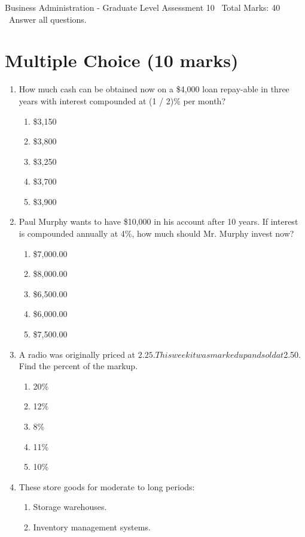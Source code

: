 \documentclass[12pt]{article}
\begin{document}
\begin{center}
Business Administration - Graduate Level Assessment 10 \
Total Marks: 40 \
Answer all questions.
\end{center}

\section*{Multiple Choice (10 marks)}
\begin{enumerate}[label=\arabic*.]
\item How much cash can be obtained now on a \$4,000 loan repay-able in three years with interest compounded at (1 / 2)\% per month?
\begin{enumerate}[label=(\alph*)]
    \item \$3,150
    \item \$3,800
    \item \$3,250
    \item \$3,700
    \item \$3,900
\end{enumerate}
\item Paul Murphy wants to have \$10,000 in his account after 10 years. If interest is compounded annually at 4\%, how much should Mr. Murphy invest now?
\begin{enumerate}[label=(\alph*)]
    \item \$7,000.00
    \item \$8,000.00
    \item \$6,500.00
    \item \$6,000.00
    \item \$7,500.00
\end{enumerate}
\item A radio was originally priced at $2.25. This week it was marked up and sold at $2.50. Find the percent of the markup.
\begin{enumerate}[label=(\alph*)]
    \item 20\%
    \item 12\%
    \item 8\%
    \item 11\%
    \item 10\%
\end{enumerate}
\item These store goods for moderate to long periods:
\begin{enumerate}[label=(\alph*)]
    \item Storage warehouses.
    \item Inventory management systems.

\end{enumerate}
\end{enumerate}
\end{document}
